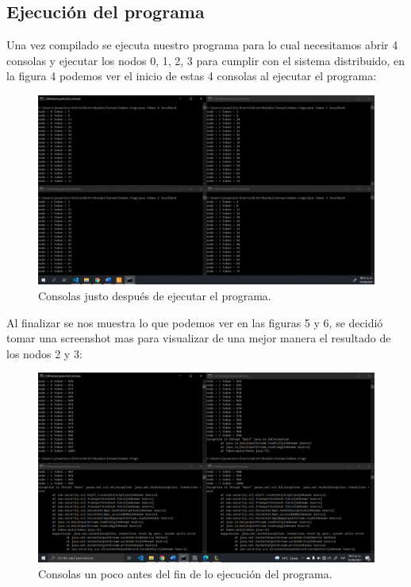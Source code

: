 \documentclass[11pt]{article}
\begin{document}
		\subsection{Ejecución del programa}
		Una vez compilado se ejecuta nuestro programa para lo cual necesitamos abrir 4 consolas y ejecutar los nodos 0, 1, 2, 3 para cumplir con el sistema distribuido, en la figura 4 podemos ver el inicio de estas 4 consolas al ejecutar el programa:
		\begin{figure}[H]
			\centering
			\includegraphics[scale=0.34]{resources/ejecucioninicio.png}
			\caption{Consolas justo después de ejecutar el programa. }\label{fig:picture}
		\end{figure}
		Al finalizar se nos muestra lo que podemos ver en las figuras 5 y 6, se decidió tomar una screenshot mas para visualizar de una mejor manera el resultado de los nodos 2 y 3:
		\begin{figure}[H]
			\centering
			\includegraphics[scale=0.42]{resources/ejecucionfin0.png}
			\caption{Consolas un poco antes del fin de lo ejecución del programa.}\label{fig:picture}
		\end{figure}
\end{document}
